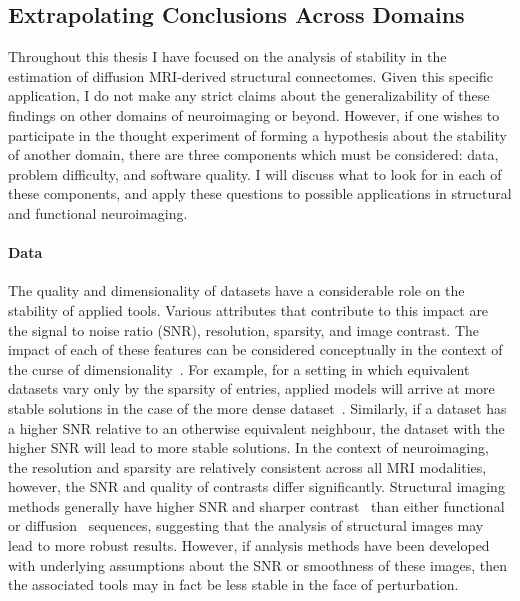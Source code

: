 \subsection{Extrapolating Conclusions Across Domains}

Throughout this thesis I have focused on the analysis of stability in the estimation of diffusion MRI-derived
structural connectomes. Given this specific application, I do not make any strict claims about the generalizability
of these findings on other domains of neuroimaging or beyond. However, if one wishes to participate in the thought
experiment of forming a hypothesis about the stability of another domain, there are three components which must
be considered: data, problem difficulty, and software quality. I will discuss what to look for in each of these
components, and apply these questions to possible applications in structural and functional neuroimaging.

\paragraph*{Data}
The quality and dimensionality of datasets have a considerable role on the stability of applied tools. Various
attributes that contribute to this impact are the signal to noise ratio (SNR), resolution, sparsity, and image
contrast. The impact of each of these features can be considered conceptually in the context of the curse of
dimensionality~\cite{friedman1997bias}. For example, for a setting in which equivalent datasets vary only by
the sparsity of entries, applied models will arrive at more stable solutions in the case of the more dense
dataset~\cite{geman1992neural}. Similarly, if a dataset has a higher SNR relative to an otherwise equivalent
neighbour, the dataset with the higher SNR will lead to more stable solutions. In the context of neuroimaging,
the resolution and sparsity are relatively consistent across all MRI modalities, however, the SNR and quality
of contrasts differ significantly. Structural imaging methods generally have higher SNR and sharper
contrast~\cite{bergamino2014review,chavhan2009principles} than either functional~\cite{logothetis2004nature} or
diffusion~\cite{thomason2011diffusion} sequences, suggesting that the analysis of structural images may lead to
more robust results. However, if analysis methods have been developed with underlying assumptions about the SNR
or smoothness of these images, then the associated tools may in fact be less stable in the face of perturbation.

